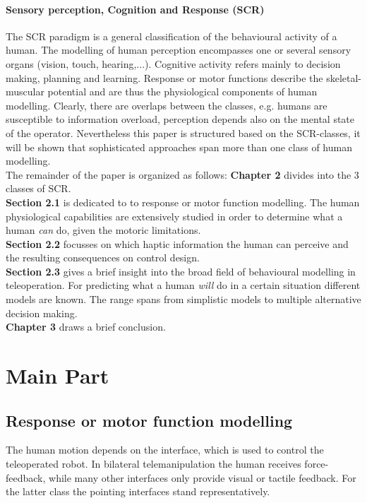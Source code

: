\documentclass[a4paper,twoside, openright,12pt]{report}
\begin{document}
\subsubsection{Sensory perception, Cognition and Response (SCR)}
The SCR paradigm \cite{Sheridian1992} is a general classification of the behavioural activity of a human. The modelling of human perception encompasses one or several sensory organs (vision, touch, hearing,...). Cognitive activity refers mainly to decision making, planning and learning. Response or motor functions describe the skeletal-muscular potential and are thus the physiological components of human modelling. Clearly, there are overlaps between the classes, e.g. humans are susceptible to information overload, perception depends also on the mental state of the operator. Nevertheless this paper is structured based on the SCR-classes, it will be shown that sophisticated approaches span more than one class of human modelling.\\
The remainder of the paper is organized as follows: \textbf{Chapter 2} divides into the 3 classes of SCR.\\
\textbf{Section 2.1} is dedicated to to response or motor function modelling. The human physiological capabilities are extensively studied in order to determine what a human \emph{can} do, given the motoric limitations. \\
\textbf{Section 2.2} focusses on which haptic information the human can perceive and the resulting consequences on control design.\\
\textbf{Section 2.3} gives a brief insight into the broad field of behavioural modelling in teleoperation. For predicting what a human \emph{will} do in a certain situation different models are known. The range spans from simplistic models to multiple alternative decision making.   \\
\textbf{Chapter 3} draws a brief conclusion.
  












\chapter{Main Part}
\section{Response or motor function modelling}
The human motion depends on the interface, which is used to control the teleoperated robot. In bilateral telemanipulation the human receives force-feedback, while many other interfaces only provide visual or tactile feedback. For the latter class the pointing interfaces stand representatively. 
\end{document}
